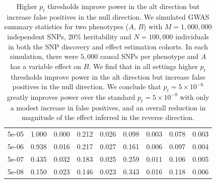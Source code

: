 \documentclass{article}
\begin{document}
\begin{table}[H]
\begin{tabular}{lrrrrrrrr}
\hspace{1em}5e-05 & 1.000 & 0.000 & 0.212 & 0.026 & 0.098 & 0.003 & 0.078 & 0.003\\
\hspace{1em}5e-06 & 0.938 & 0.016 & 0.217 & 0.027 & 0.161 & 0.006 & 0.097 & 0.004\\
\hspace{1em}5e-07 & 0.435 & 0.032 & 0.183 & 0.025 & 0.259 & 0.011 & 0.106 & 0.005\\
\hspace{1em}5e-08 & 0.150 & 0.023 & 0.146 & 0.023 & 0.343 & 0.016 & 0.118 & 0.006\\
\bottomrule
\end{tabular}
\caption{Higher $p_t$ thresholds improve power in the alt direction but increase
false positives in the null direction. We simulated GWAS summary statistics for two
 phenotypes ($A$, $B$) with $M=1,000,000$
independent SNPs, $20\%$ heritability and $N = 100,000$ individuals in both
 the SNP discovery and effect estimation cohorts. In each simulation, there
 were $5,000$ causal SNPs per phenotype and $A$ has a variable effect on $B$. We
 find that in all settings higher $p_t$ thresholds improve power in the alt direction but increase
false positives in the null direction. We conclude that $p_t = 5\times 10^{-6}$ 
greatly improves power over the standard $p_t = 5\times 10^{-8}$ with only a modest
increase in false positives, and an overall reduction in magnitude of the effect inferred
in the reverse direction. }
\end{table}
\end{document}
